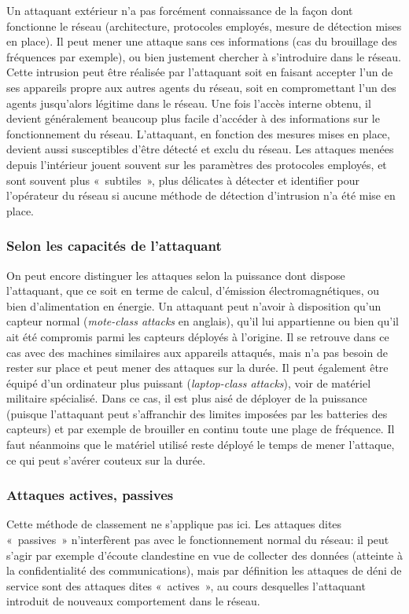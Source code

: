 Un attaquant extérieur n'a pas forcément connaissance de la façon dont fonctionne le réseau (architecture, protocoles employés, mesure de détection mises en place).
Il peut mener une attaque sans ces informations (cas du brouillage des fréquences par exemple), ou bien justement chercher à s'introduire dans le réseau.
Cette intrusion peut être réalisée par l'attaquant soit en faisant accepter l'un de ses appareils propre aux autres agents du réseau, soit en compromettant l'un des agents jusqu'alors légitime dans le réseau.
Une fois l'accès interne obtenu, il devient généralement beaucoup plus facile d'accéder à des informations sur le fonctionnement du réseau.
L'attaquant, en fonction des mesures mises en place, devient aussi susceptibles d'être détecté et exclu du réseau.
Les attaques menées depuis l'intérieur jouent souvent sur les paramètres des protocoles employés, et sont souvent plus « subtiles », plus délicates à détecter et identifier pour l'opérateur du réseau si aucune méthode de détection d'intrusion n'a été mise en place.

\subsubsection{Selon les capacités de l'attaquant}
On peut encore distinguer les attaques selon la puissance dont dispose l'attaquant, que ce soit en terme de calcul, d'émission électromagnétiques, ou bien d'alimentation en énergie.
Un attaquant peut n'avoir à disposition qu'un capteur normal (\textit{mote-class attacks} en anglais), qu'il lui appartienne ou bien qu'il ait été compromis parmi les capteurs déployés à l'origine.
Il se retrouve dans ce cas avec des machines similaires aux appareils attaqués, mais n'a pas besoin de rester sur place et peut mener des attaques sur la durée.
Il peut également être équipé d'un ordinateur plus puissant (\textit{laptop-class attacks}), voir de matériel militaire spécialisé.
Dans ce cas, il est plus aisé de déployer de la puissance (puisque l'attaquant peut s'affranchir des limites imposées par les batteries des capteurs) et par exemple de brouiller en continu toute une plage de fréquence.
Il faut néanmoins que le matériel utilisé reste déployé le temps de mener l'attaque, ce qui peut s'avérer couteux sur la durée.

\subsubsection{Attaques actives, passives}
Cette méthode de classement ne s'applique pas ici.
Les attaques dites « passives » n'interfèrent pas avec le fonctionnement normal du réseau: il peut s'agir par exemple d'écoute clandestine en vue de collecter des données (atteinte à la confidentialité des communications), mais par définition les attaques de déni de service sont des attaques dites « actives », au cours desquelles l'attaquant introduit de nouveaux comportement dans le réseau.

